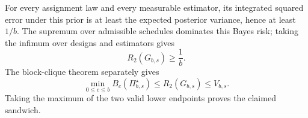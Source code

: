 For every assignment law and every measurable estimator, its integrated squared error under this prior is at least the expected posterior variance, hence at least \(1/b\). The supremum over admissible schedules dominates this Bayes risk; taking the infimum over designs and estimators gives
\[
R_2(G_{b,s})\geq\frac1b.
\]
The block-clique theorem separately gives
\[
\min_{0\leq c\leq b}B_c(\Pi_{b,s}^{\star})\leq R_2(G_{b,s})\leq V_{b,s}.
\]
Taking the maximum of the two valid lower endpoints proves the claimed sandwich.